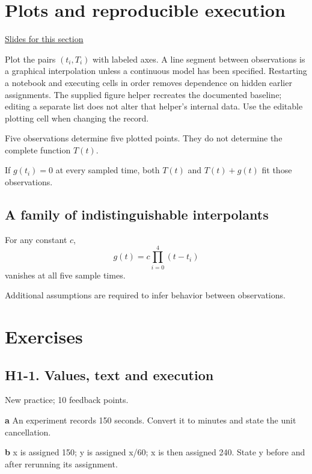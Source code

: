 \documentclass[11pt,letterpaper]{article}
\theoremstyle{definition}\newtheorem{definition}{Definition}\newtheorem{example}{Example}
\numberwithin{equation}{section}
\begin{document}
\section{Plots and reproducible execution}
\hypertarget{note-plots-and-reproducible-execution}{}\label{note:plots-and-reproducible-execution}
{\small \href{slides.html\#frame=plots-and-reproducible-execution\&step=1}{Slides for this section}}\par
Plot the pairs $(t_i,T_i)$ with labeled axes. A line segment between observations is a graphical interpolation unless a continuous model has been specified. Restarting a notebook and executing cells in order removes dependence on hidden earlier assignments. The supplied figure helper recreates the documented baseline; editing a separate list does not alter that helper's internal data. Use the editable plotting cell when changing the record.

Five observations determine five plotted points. They do not determine the complete function $T(t)$.

If $g(t_i)=0$ at every sampled time, both $T(t)$ and $T(t)+g(t)$ fit those observations.

\subsection*{A family of indistinguishable interpolants}
For any constant $c$,
\[
g(t)=c\prod_{i=0}^{4}(t-t_i)
\]
vanishes at all five sample times.

Additional assumptions are required to infer behavior between observations.
\bigskip
\section*{Exercises}
\par\noindent\begin{minipage}{\linewidth}
\subsection*{H1-1. Values, text and execution}
New practice; 10 feedback points.

\textbf{a} An experiment records 150 seconds. Convert it to minutes and state the unit cancellation.

\end{minipage}\par\medskip
\textbf{b} x is assigned 150; y is assigned x/60; x is then assigned 240. State y before and after rerunning its assignment.
\end{document}
